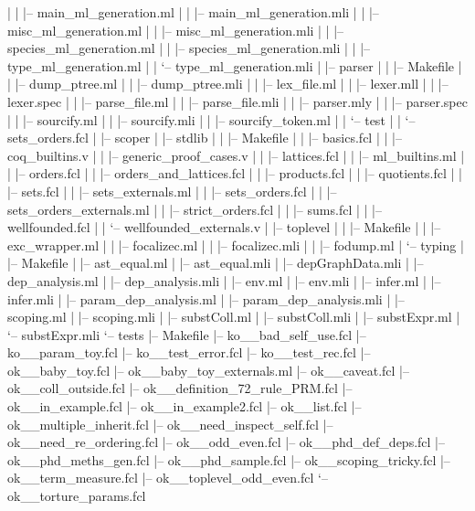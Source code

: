 \begin{itemize}
\begin{itemize}
|   |   |-- main\_ml\_generation.ml
|   |   |-- main\_ml\_generation.mli
|   |   |-- misc\_ml\_generation.ml
|   |   |-- misc\_ml\_generation.mli
|   |   |-- species\_ml\_generation.ml
|   |   |-- species\_ml\_generation.mli
|   |   |-- type\_ml\_generation.ml
|   |   `-- type\_ml\_generation.mli
|   |-- parser
|   |   |-- Makefile
|   |   |-- dump\_ptree.ml
|   |   |-- dump\_ptree.mli
|   |   |-- lex\_file.ml
|   |   |-- lexer.mll
|   |   |-- lexer.spec
|   |   |-- parse\_file.ml
|   |   |-- parse\_file.mli
|   |   |-- parser.mly
|   |   |-- parser.spec
|   |   |-- sourcify.ml
|   |   |-- sourcify.mli
|   |   |-- sourcify\_token.ml
|   |   `-- test
|   |       `-- sets\_orders.fcl
|   |-- scoper
|   |-- stdlib
|   |   |-- Makefile
|   |   |-- basics.fcl
|   |   |-- coq\_builtins.v
|   |   |-- generic\_proof\_cases.v
|   |   |-- lattices.fcl
|   |   |-- ml\_builtins.ml
|   |   |-- orders.fcl
|   |   |-- orders\_and\_lattices.fcl
|   |   |-- products.fcl
|   |   |-- quotients.fcl
|   |   |-- sets.fcl
|   |   |-- sets\_externals.ml
|   |   |-- sets\_orders.fcl
|   |   |-- sets\_orders\_externals.ml
|   |   |-- strict\_orders.fcl
|   |   |-- sums.fcl
|   |   |-- wellfounded.fcl
|   |   `-- wellfounded\_externals.v
|   |-- toplevel
|   |   |-- Makefile
|   |   |-- exc\_wrapper.ml
|   |   |-- focalizec.ml
|   |   |-- focalizec.mli
|   |   |-- fodump.ml
|   `-- typing
|       |-- Makefile
|       |-- ast\_equal.ml
|       |-- ast\_equal.mli
|       |-- depGraphData.mli
|       |-- dep\_analysis.ml
|       |-- dep\_analysis.mli
|       |-- env.ml
|       |-- env.mli
|       |-- infer.ml
|       |-- infer.mli
|       |-- param\_dep\_analysis.ml
|       |-- param\_dep\_analysis.mli
|       |-- scoping.ml
|       |-- scoping.mli
|       |-- substColl.ml
|       |-- substColl.mli
|       |-- substExpr.ml
|       `-- substExpr.mli
`-- tests
    |-- Makefile
    |-- ko\_\_bad\_self\_use.fcl
    |-- ko\_\_param\_toy.fcl
    |-- ko\_\_test\_error.fcl
    |-- ko\_\_test\_rec.fcl
    |-- ok\_\_baby\_toy.fcl
    |-- ok\_\_baby\_toy\_externals.ml
    |-- ok\_\_caveat.fcl
    |-- ok\_\_coll\_outside.fcl
    |-- ok\_\_definition\_72\_rule\_PRM.fcl
    |-- ok\_\_in\_example.fcl
    |-- ok\_\_in\_example2.fcl
    |-- ok\_\_list.fcl
    |-- ok\_\_multiple\_inherit.fcl
    |-- ok\_\_need\_inspect\_self.fcl
    |-- ok\_\_need\_re\_ordering.fcl
    |-- ok\_\_odd\_even.fcl
    |-- ok\_\_phd\_def\_deps.fcl
    |-- ok\_\_phd\_meths\_gen.fcl
    |-- ok\_\_phd\_sample.fcl
    |-- ok\_\_scoping\_tricky.fcl
    |-- ok\_\_term\_measure.fcl
    |-- ok\_\_toplevel\_odd\_even.fcl
    `-- ok\_\_torture\_params.fcl
  \end{itemize}
\end{itemize}

